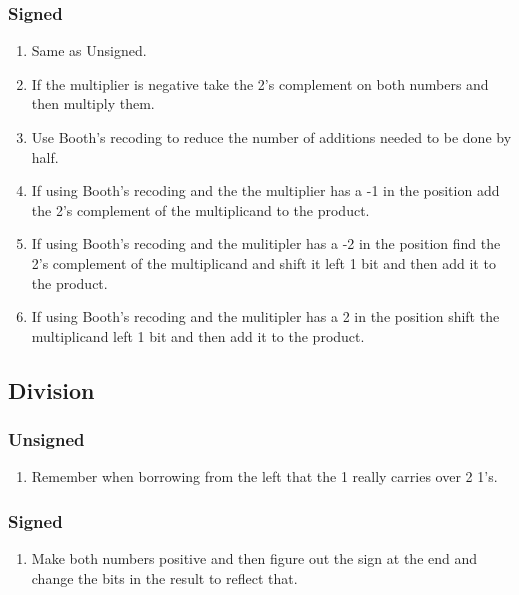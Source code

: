 \documentclass[12pt]{article}
\begin{document}
\subsubsection*{Signed}
\begin{enumerate}
	\item{Same as Unsigned.}
	\item{If the multiplier is negative take the 2's complement on both numbers and then multiply them.}
	\item{Use Booth's recoding to reduce the number of additions needed to be done by half.}
	\item{If using Booth's recoding and the the multiplier has a -1 in the position add the 2's complement of the multiplicand to the product.}
	\item{If using Booth's recoding and the mulitipler has a -2 in the position find the 2's complement of the multiplicand and shift it left 1 bit
	and then add it to the product.}
	\item{If using Booth's recoding and the mulitipler has a 2 in the position shift the multiplicand left 1 bit
	and then add it to the product.}
\end{enumerate}

\subsection*{Division}
\subsubsection*{Unsigned}
\begin{enumerate}
	\item{Remember when borrowing from the left that the 1 really carries over 2 1's.}
\end{enumerate}

\subsubsection*{Signed}
\begin{enumerate}
	\item{Make both numbers positive and then figure out the sign at the end and change the bits in the result to reflect that.}
\end{enumerate}
\end{document}
